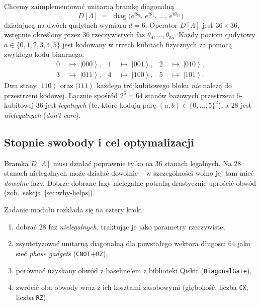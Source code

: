 \documentclass[11pt,a4paper]{article}
\newcommand{\1}{\mathbf{1}}
\newcommand{\diag}{\operatorname{diag}}
\newcommand{\ket}[1]{\left|#1\right\rangle}
\newcommand{\code}[1]{\texttt{#1}}
\begin{document}
Chcemy zaimplementować unitarną bramkę diagonalną
\begin{equation}
\label{eq:Dlambda}
D[\Lambda] \;=\; \diag\!\bigl(e^{i\theta_{0}},\,e^{i\theta_{1}},\,\dots,\,
                              e^{i\theta_{35}}\bigr)
\end{equation}
działającą na dwóch qudytach wymiaru $d=6$. Operator $D[\Lambda]$ jest
$36\times 36$, wstępnie określony przez 36 rzeczywistych faz
$\theta_{0},\dots,\theta_{35}$. Każdy poziom qudytowy
$a\in\{0,1,2,3,4,5\}$ jest kodowany w trzech kubitach fizycznych za pomocą
zwykłego kodu binarnego:
\begin{equation}
\label{eq:encoding}
\begin{aligned}
0 &\;\mapsto\; \ket{000}, &
1 &\;\mapsto\; \ket{001}, &
2 &\;\mapsto\; \ket{010}, \\[1pt]
3 &\;\mapsto\; \ket{011}, &
4 &\;\mapsto\; \ket{100}, &
5 &\;\mapsto\; \ket{101}.
\end{aligned}
\end{equation}
Dwa stany $\ket{110}$ oraz $\ket{111}$ każdego trójkubitowego bloku
\emph{nie} należą do przestrzeni kodowej. Łącznie spośród $2^{6}=64$
stanów bazowych przestrzeni 6\nobreakdash-kubitowej $36$ jest
\emph{legalnych} (te, które kodują parę $(a,b)\in\{0,\dots,5\}^{2}$),
a $28$ jest \emph{nielegalnych} (\emph{don't-care}).

\subsection{Stopnie swobody i cel optymalizacji}

Bramka $D[\Lambda]$ musi działać poprawnie tylko na 36 stanach
legalnych. Na 28 stanach nielegalnych może działać dowolnie -- w
szczególności wolno jej tam mieć \emph{dowolne} fazy. Dobrze dobrane
fazy nielegalne potrafią drastycznie uprościć obwód (zob.\
sekcja~\ref{sec:why-helps}).

Zadanie modułu rozkłada się na cztery kroki:
\begin{enumerate}[leftmargin=*]
  \item dobrać 28 faz \emph{nielegalnych}, traktując je jako parametry
        rzeczywiste,
  \item zsyntetyzować unitarną diagonalną dla powstałego wektora długości
        64 jako sieć \emph{phase gadgets} (\code{CNOT}+\code{RZ}),
  \item porównać uzyskany obwód z baseline'em z biblioteki Qiskit
        (\code{DiagonalGate}),
  \item zwrócić oba obwody wraz z ich kosztami zasobowymi (głębokość,
        liczba \code{CX}, liczba \code{RZ}).
\end{enumerate}
\end{document}
